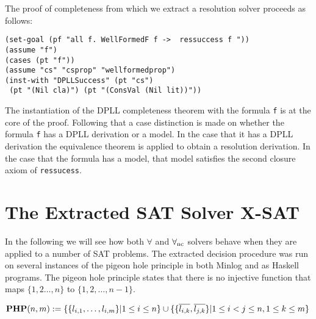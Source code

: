 The proof of completeness from which we extract a resolution solver proceeds as follows:

\begin{lstlisting}[caption = "Beginning of the Resolution Completeness Proof"]
(set-goal (pf "all f. WellFormedF f ->  ressuccess f "))
(assume "f")
(cases (pt "f"))
(assume "cs" "csprop" "wellformedprop")
(inst-with "DPLLSuccess" (pt "cs") 
 (pt "(Nil cla)") (pt "(ConsVal (Nil lit))"))
\end{lstlisting}

The instantiation of the DPLL completeness theorem with the formula  \texttt{f} is at the core of the proof. Following that a case distinction is made on whether the formula \texttt{f} has a DPLL derivation or a model. In the case that it has a DPLL derivation the equivalence theorem is applied to obtain a resolution derivation. In the case that the formula has a model, that model satisfies the second closure axiom of \texttt{ressucess}. 

\section{The Extracted SAT Solver X-SAT}

In the following we will see how both $\forall$ and $\forall_{\mathrm{nc}}$ solvers 
behave when they are applied to a number of SAT problems. The extracted 
decision procedure was run on several instances of the pigeon hole 
principle \cite{SC79} in both Minlog and as Haskell programs. The pigeon hole principle states that there is 
no injective function that maps $\{ 1, 2 \ldots , n \}$ to $\{1,2, \ldots, n-1 \}$.

\begin{mydef}
$\mathbf{PHP}(n,m) := \{\{l_{i,1},\ldots,l_{i,m}\} | 1 \leq i \leq n  \} \cup \{ \{\overline{l_{i,k}},\overline{ l_{j,k}}\} | 1 \leq i < j \leq n, 1 \leq k \leq m \}  $
 \end{mydef}

